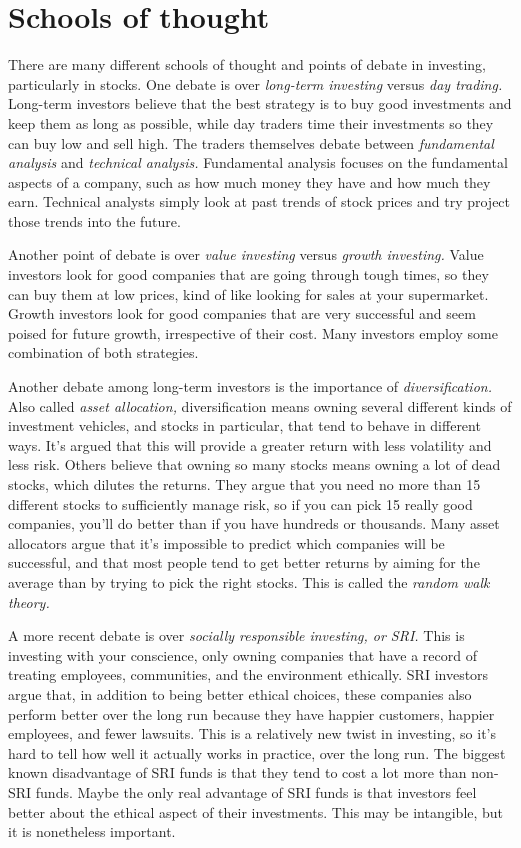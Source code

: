 \section{Schools of thought}
There are many different schools of thought and points of debate in investing, particularly in stocks. One debate is over \emph{long-term investing} versus \emph{day trading.} Long-term investors believe that the best strategy is to buy good investments and keep them as long as possible, while day traders time their investments so they can buy low and sell high. The traders themselves debate between \emph{fundamental analysis} and \emph{technical analysis.} Fundamental analysis focuses on the fundamental aspects of a company, such as how much money they have and how much they earn. Technical analysts simply look at past trends of stock prices and try project those trends into the future.

Another point of debate is over \emph{value investing} versus \emph{growth investing.} Value investors look for good companies that are going through tough times, so they can buy them at low prices, kind of like looking for sales at your supermarket. Growth investors look for good companies that are very successful and seem poised for future growth, irrespective of their cost. Many investors employ some combination of both strategies.

Another debate among long-term investors is the importance of \emph{diversification.} Also called \emph{asset allocation,} diversification means owning several different kinds of investment vehicles, and stocks in particular, that tend to behave in different ways. It's argued that this will provide a greater return with less volatility and less risk. Others believe that owning so many stocks means owning a lot of dead stocks, which dilutes the returns. They argue that you need no more than 15 different stocks to sufficiently manage risk, so if you can pick 15 really good companies, you'll do better than if you have hundreds or thousands. Many asset allocators argue that it's impossible to predict which companies will be successful, and that most people tend to get better returns by aiming for the average than by trying to pick the right stocks. This is called the \emph{random walk theory.}

A more recent debate is over \emph{socially responsible investing, or SRI.} This is investing with your conscience, only owning companies that have a record of treating employees, communities, and the environment ethically. SRI investors argue that, in addition to being better ethical choices, these companies also perform better over the long run because they have happier customers, happier employees, and fewer lawsuits. This is a relatively new twist in investing, so it's hard to tell how well it actually works in practice, over the long run. The biggest known disadvantage of SRI funds is that they tend to cost a lot more than non-SRI funds. Maybe the only real advantage of SRI funds is that investors feel better about the ethical aspect of their investments. This may be intangible, but it is nonetheless important.

